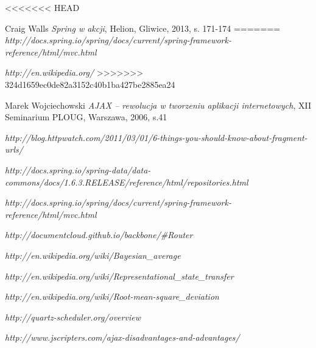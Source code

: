\begin{thebibliography}{99}

<<<<<<< HEAD
\begin{comment} dot. alg. rankingowego \end{comment}

	Craig Walls
	\emph{Spring w akcji},
	Helion,
	Gliwice, 2013,
	s. 171-174
=======
	\emph{http://docs.spring.io/spring/docs/current/spring-framework-reference/html/mvc.html}
	
	
	\emph{http://en.wikipedia.org/}	
>>>>>>> 324d1659ec0de82a3152c40b1ba427be2885ea24
	
	Marek Wojciechowski
	\emph{AJAX – rewolucja w tworzeniu aplikacji internetowych},
	XII Seminarium PLOUG,
	Warszawa, 2006,
	s.41

	\emph{http://blog.httpwatch.com/2011/03/01/6-things-you-should-know-about-fragment-urls/}

	\emph{http://docs.spring.io/spring-data/data-commons/docs/1.6.3.RELEASE/reference/html/repositories.html}

	\emph{http://docs.spring.io/spring/docs/current/spring-framework-reference/html/mvc.html}
	
	\emph{http://documentcloud.github.io/backbone/\#Router}

	\emph{http://en.wikipedia.org/wiki/Bayesian\_average}
	
	\emph{http://en.wikipedia.org/wiki/Representational\_state\_transfer}	
		
	\emph{http://en.wikipedia.org/wiki/Root-mean-square\_deviation}
 
	\emph{http://quartz-scheduler.org/overview}

	\emph{http://www.jscripters.com/ajax-disadvantages-and-advantages/}

\end{thebibliography}
